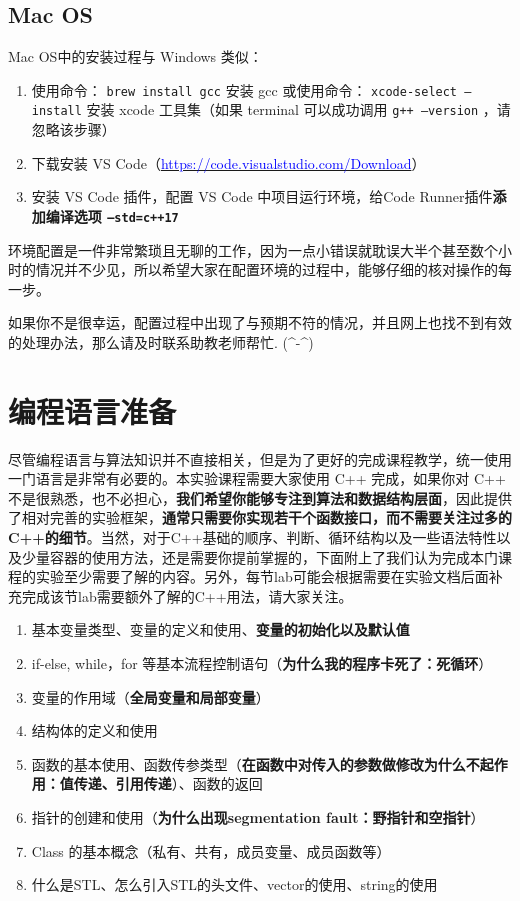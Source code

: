 \documentclass{article}
\begin{document}
\subsection{Mac OS}
\noindent Mac OS中的安装过程与 Windows 类似：
\begin{enumerate}
    \item 使用命令： \texttt{brew install gcc} 安装 gcc 或使用命令： \texttt{xcode-select --install} 安装 xcode 工具集（如果 terminal 可以成功调用 \texttt{g++ --version} ，请忽略该步骤）
    \item 下载安装 VS Code（\href{https://code.visualstudio.com/Download}{\textcolor{blue}{https://code.visualstudio.com/Download}}）
    \item 安装 VS Code 插件，配置 VS Code 中项目运行环境，给Code Runner插件\textbf{添加编译选项 \texttt{--std=c++17}}
\end{enumerate}

环境配置是一件非常繁琐且无聊的工作，因为一点小错误就耽误大半个甚至数个小时的情况并不少见，所以希望大家在配置环境的过程中，能够仔细的核对操作的每一步。

如果你不是很幸运，配置过程中出现了与预期不符的情况，并且网上也找不到有效的处理办法，那么请及时联系助教老师帮忙. (\^{}-\^{})

\section{编程语言准备}
尽管编程语言与算法知识并不直接相关，但是为了更好的完成课程教学，统一使用一门语言是非常有必要的。本实验课程需要大家使用 C++ 完成，如果你对 C++ 不是很熟悉，也不必担心，\textbf{我们希望你能够专注到算法和数据结构层面}，因此提供了相对完善的实验框架，\textbf{通常只需要你实现若干个函数接口，而不需要关注过多的C++的细节}。当然，对于C++基础的顺序、判断、循环结构以及一些语法特性以及少量容器的使用方法，还是需要你提前掌握的，下面附上了我们认为完成本门课程的实验至少需要了解的内容。另外，每节lab可能会根据需要在实验文档后面补充完成该节lab需要额外了解的C++用法，请大家关注。\\


\begin{enumerate}
    \item 基本变量类型、变量的定义和使用、\textbf{变量的初始化以及默认值}
    \item if-else, while，for 等基本流程控制语句（\textbf{为什么我的程序卡死了：死循环}）
    \item 变量的作用域（\textbf{全局变量和局部变量}）
    \item 结构体的定义和使用
    \item 函数的基本使用、函数传参类型（\textbf{在函数中对传入的参数做修改为什么不起作用：值传递、引用传递}）、函数的返回
    \item 指针的创建和使用（\textbf{为什么出现segmentation fault：野指针和空指针}）
    \item Class 的基本概念（私有、共有，成员变量、成员函数等）
    \item 什么是STL、怎么引入STL的头文件、vector的使用、string的使用
\end{enumerate}
\end{document}
